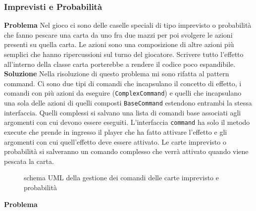 \subsubsection{Imprevisti e Probabilità}
\textbf{Problema}\newline
Nel gioco ci sono delle caselle speciali di tipo imprevisto o probabilità che fanno pescare una carta da uno fra due mazzi per poi svolgere le azioni presenti su quella carta.
Le azioni sono una composizione di altre azioni più semplici che hanno ripercussioni sul turno del giocatore.
Scrivere tutto l’effetto all’interno della classe carta porterebbe a rendere il codice poco espandibile.
\textbf{Soluzione}\newline
Nella risoluzione di questo problema mi sono rifatta al pattern command. Ci sono due tipi di comandi che incapsulano il concetto di effetto, i comandi con più azioni da eseguire (\texttt{ComplexCommand}) e quelli che incapsulano una sola delle azioni di quelli composti \texttt{BaseCommand} estendono entrambi la stessa interfaccia. Quelli complessi  si salvano una lista di comandi base associati agli argomenti con cui devono essere eseguiti. 
L’interfaccia \texttt{command} ha solo il metodo execute che prende in ingresso il player che ha fatto attivare l’effetto e gli argomenti con cui quell’effetto deve essere attivato. 
Le carte imprevisto o probabilità si salveranno un comando complesso che verrà attivato quando viene pescata la carta.
\begin{figure}[H]
    \centering
    \caption{schema UML della gestione dei comandi delle carte imprevisto e probabilità}
    \label{img:ArchitectureDiagram-Pagina-1}
\end{figure}
\textbf{Problema}\newline
